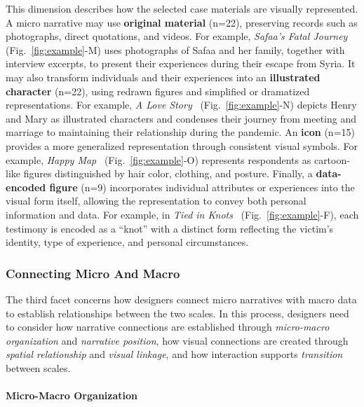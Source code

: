 This dimension describes how the selected case materials are visually represented. A micro narrative may use \textbf{original material} (n=22), preserving records such as photographs, direct quotations, and videos. For example, \textit{Safaa’s Fatal Journey}~\cite{spencer2015safaa} (Fig.~\ref{fig:example}-M) uses photographs of Safaa and her family, together with interview excerpts, to present their experiences during their escape from Syria. It may also transform individuals and their experiences into an \textbf{illustrated character} (n=22), using redrawn figures and simplified or dramatized representations. For example, \textit{A Love Story}~\cite{chang2026love} (Fig.~\ref{fig:example}-N) depicts Henry and Mary as illustrated characters and condenses their journey from meeting and marriage to maintaining their relationship during the pandemic. An \textbf{icon} (n=15) provides a more generalized representation through consistent visual symbols. For example, \textit{Happy Map}~\cite{happymap2026} (Fig.~\ref{fig:example}-O) represents respondents as cartoon-like figures distinguished by hair color, clothing, and posture. Finally, a \textbf{data-encoded figure} (n=9) incorporates individual attributes or experiences into the visual form itself, allowing the representation to convey both personal information and data. For example, in \textit{Tied in Knots}~\cite{tiedinknots} (Fig.~\ref{fig:example}-F), each testimony is encoded as a “knot” with a distinct form reflecting the victim’s identity, type of experience, and personal circumstances.

\subsubsection{Connecting Micro And Macro}
The third facet concerns how designers connect micro narratives with macro data to establish relationships between the two scales. In this process, designers need to consider how narrative connections are established through \textit{micro-macro organization} and \textit{narrative position}, how visual connections are created through \textit{spatial relationship} and \textit{visual linkage}, and how interaction supports \textit{transition} between scales.

\paragraph{\textbf{\textcolor{imp}{Micro-Macro Organization}}}

